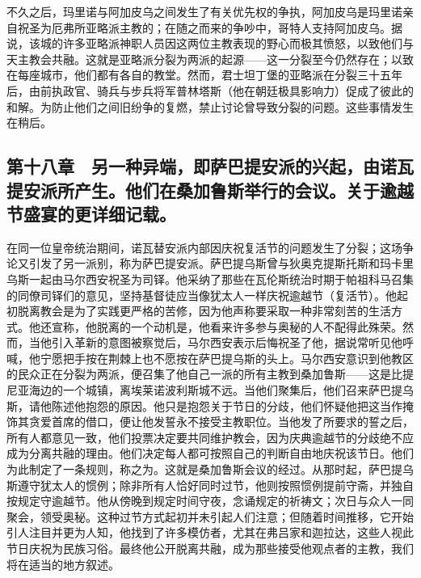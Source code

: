 不久之后，玛里诺与阿加皮乌之间发生了有关优先权的争执，阿加皮乌是玛里诺亲自祝圣为厄弗所亚略派主教的；在随之而来的争吵中，哥特人支持阿加皮乌。据说，该城的许多亚略派神职人员因这两位主教表现的野心而极其愤怒，以致他们与天主教会共融。这就是亚略派分裂为两派的起源——这一分裂至今仍然存在；以致在每座城市，他们都有各自的教堂。然而，君士坦丁堡的亚略派在分裂三十五年后，由前执政官、骑兵与步兵将军普林塔斯（他在朝廷极具影响力）促成了彼此的和解。为防止他们之间旧纷争的复燃，禁止讨论曾导致分裂的问题。这些事情发生在稍后。\par


\subsection{第十八章　另一种异端，即萨巴提安派的兴起，由诺瓦提安派所产生。他们在桑加鲁斯举行的会议。关于逾越节盛宴的更详细记载。}

在同一位皇帝统治期间，诺瓦替安派内部因庆祝复活节的问题发生了分裂；这场争论又引发了另一派别，称为萨巴提安派。萨巴提乌斯曾与狄奥克提斯托斯和玛卡里乌斯一起由马尔西安祝圣为司铎。他采纳了那些在瓦伦斯统治时期于帕祖科马召集的同僚司铎们的意见，坚持基督徒应当像犹太人一样庆祝逾越节（复活节）。他起初脱离教会是为了实践更严格的苦修，因为他声称要采取一种非常刻苦的生活方式。他还宣称，他脱离的一个动机是，他看来许多参与奥秘的人不配得此殊荣。然而，当他引入革新的意图被察觉后，马尔西安表示后悔祝圣了他，据说常听见他呼喊，他宁愿把手按在荆棘上也不愿按在萨巴提乌斯的头上。马尔西安意识到他教区的民众正在分裂为两派，便召集了他自己一派的所有主教到桑加鲁斯——这是比提尼亚海边的一个城镇，离埃莱诺波利斯城不远。当他们聚集后，他们召来萨巴提乌斯，请他陈述他抱怨的原因。他只是抱怨关于节日的分歧，他们怀疑他把这当作掩饰其贪爱首席的借口，便让他发誓永不接受主教职位。当他发了所要求的誓之后，所有人都意见一致，他们投票决定要共同维护教会，因为庆典逾越节的分歧绝不应成为分离共融的理由。他们决定每人都可按照自己的判断自由地庆祝该节日。他们为此制定了一条规则，称之为。这就是桑加鲁斯会议的经过。从那时起，萨巴提乌斯遵守犹太人的惯例；除非所有人恰好同时过节，他则按照惯例提前守斋，并独自按规定守逾越节。他从傍晚到规定时间守夜，念诵规定的祈祷文；次日与众人一同聚会，领受奥秘。这种过节方式起初并未引起人们注意；但随着时间推移，它开始引人注目并更为人知，他找到了许多模仿者，尤其在弗吕家和迦拉达，这些人视此节日庆祝为民族习俗。最终他公开脱离共融，成为那些接受他观点者的主教，我们将在适当的地方叙述。\par

